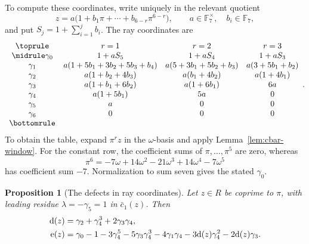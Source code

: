 \documentclass[11pt]{amsart}
\theoremstyle{plain}
\newtheorem{proposition}[theorem]{Proposition}
\theoremstyle{definition}
\numberwithin{equation}{section}
\newcommand{\F}{\mathbb F}
\newcommand{\dd}{\mathrm d}
\newcommand{\ee}{\mathrm e}
\begin{document}
To compute these coordinates, write uniquely in the relevant quotient
\[
 z=a\bigl(1+b_1\pi+\cdots+b_{6-r}\pi^{6-r}\bigr),\qquad
 a\in\F_7^\times,\quad b_i\in\F_7,
\]
and put $S_j=1+\sum_{i=1}^j b_i$.  The ray coordinates are
\begin{equation}\label{eq:ray-substitution}
\begin{array}{cccc}
\toprule
 &r=1&r=2&r=3\\
\midrule
 \gamma_0&1+aS_5&1+aS_4&1+aS_3\\
 \gamma_1&a(1+5b_1+3b_2+5b_3+b_4)
         &a(5+3b_1+5b_2+b_3)&a(3+5b_1+b_2)\\
 \gamma_2&a(1+b_2+4b_3)&a(b_1+4b_2)&a(1+4b_1)\\
 \gamma_3&a(1+b_1+6b_2)&a(1+6b_1)&6a\\
 \gamma_4&a(1+5b_1)&5a&0\\
 \gamma_5&a&0&0\\
 \gamma_6&0&0&0\\
\bottomrule
\end{array}.
\end{equation}
To obtain the table, expand $\pi^rz$ in the $\omega$-basis and apply
Lemma~\ref{lem:cbar-window}.
For the constant row, the coefficient
sums of $\pi,\ldots,\pi^5$ are zero, whereas
\[
 \pi^6=-7\omega+14\omega^2-21\omega^3+14\omega^4-7\omega^5
\]
has coefficient sum $-7$. Normalization to sum seven gives the
stated $\gamma_0$.

\begin{proposition}[The defects in ray coordinates]\label{prop:ray-defects}
Let $z\in R$ be coprime to $\pi$, with leading residue
$\lambda=-\gamma_5=1$ in $\bar c_1(z)$. Then
\begin{align}\label{eq:ray-defects}
 \dd(z)&=\gamma_2+\gamma_4^3+2\gamma_3\gamma_4,\\
 \ee(z)&=\gamma_0-1-3\gamma_4^5-5\gamma_3\gamma_4^3
          -4\gamma_1\gamma_4-3\dd(z)\gamma_4^2-2\dd(z)\gamma_3.
          \notag
\end{align}
\end{proposition}
\end{document}
